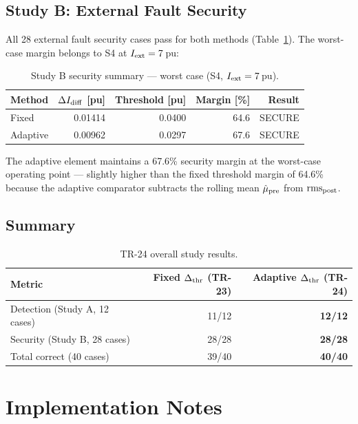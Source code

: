 \documentclass[11pt,a4paper]{article}
\begin{document}
\subsection{Study B: External Fault Security}

All 28 external fault security cases pass for both methods
(Table~\ref{tab:security}).  The worst-case margin belongs to S4 at
$I_{\rm ext}=7$\,pu:

\begin{table}[h!]
\centering
\caption{Study B security summary — worst case (S4, $I_{\rm ext}=7$\,pu).}
\label{tab:security}
\begin{tabular}{lrrrr}
\toprule
Method & $\Delta I_{\rm diff}$ [pu] & Threshold [pu]
       & Margin [\%] & Result \\
\midrule
Fixed    & 0.01414 & 0.0400 & 64.6 & SECURE \\
Adaptive & 0.00962 & 0.0297 & 67.6 & SECURE \\
\bottomrule
\end{tabular}
\end{table}

The adaptive element maintains a 67.6\% security margin at the worst-case
operating point --- slightly higher than the fixed threshold margin of
64.6\% because the adaptive comparator subtracts the rolling mean
$\hat{\mu}_{\rm pre}$ from $\mathrm{rms}_{\rm post}$.

\subsection{Summary}

\begin{table}[h!]
\centering
\caption{TR-24 overall study results.}
\label{tab:summary}
\begin{tabular}{lrr}
\toprule
Metric & Fixed $\Delta_{\rm thr}$ (TR-23) & Adaptive $\Delta_{\rm thr}$ (TR-24) \\
\midrule
Detection (Study A, 12 cases)  & 11/12 & \textbf{12/12} \\
Security  (Study B, 28 cases)  & 28/28 & \textbf{28/28} \\
Total correct (40 cases)       & 39/40 & \textbf{40/40} \\
\bottomrule
\end{tabular}
\end{table}

\section{Implementation Notes}
\end{document}
